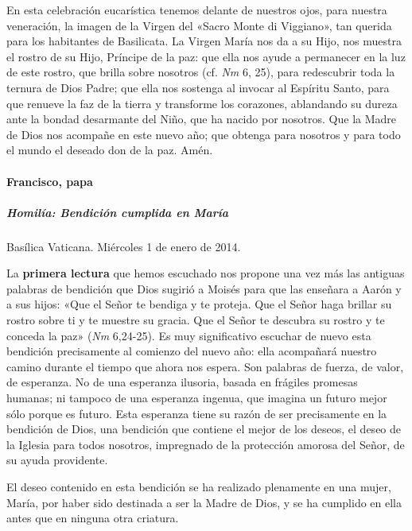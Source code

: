 \documentclass[]{article}
\let\oldparagraph\paragraph
\renewcommand{\paragraph}[1]{\oldparagraph{#1}\mbox{}}
\let\oldsubparagraph\subparagraph
\renewcommand{\subparagraph}[1]{\oldsubparagraph{#1}\mbox{}}
\begin{document}
En esta celebración eucarística tenemos delante de nuestros ojos, para
nuestra veneración, la imagen de la Virgen del «Sacro Monte di
Viggiano», tan querida para los habitantes de Basilicata. La Virgen
María nos da a su Hijo, nos muestra el rostro de su Hijo, Príncipe de la
paz: que ella nos ayude a permanecer en la luz de este rostro, que
brilla sobre nosotros (cf. \emph{Nm} 6, 25), para redescubrir toda la
ternura de Dios Padre; que ella nos sostenga al invocar al Espíritu
Santo, para que renueve la faz de la tierra y transforme los corazones,
ablandando su dureza ante la bondad desarmante del Niño, que ha nacido
por nosotros. Que la Madre de Dios nos acompañe en este nuevo año; que
obtenga para nosotros y para todo el mundo el deseado don de la paz.
Amén.

\protect\hypertarget{_Toc448662843}{}{\protect\hypertarget{_Toc448690362}{}{\protect\hypertarget{_Toc448708385}{}{\protect\hypertarget{_Toc448709471}{}{\protect\hypertarget{_Toc449554473}{}{}}}}}

\paragraph{Francisco, papa}\label{francisco-papa-6}

\subparagraph{Homilía: Bendición cumplida en
María}\label{homiluxeda-bendiciuxf3n-cumplida-en-maruxeda}

Basílica Vaticana. Miércoles 1 de enero de 2014.

La \textbf{primera lectura} que hemos escuchado nos propone una vez más
las antiguas palabras de bendición que Dios sugirió a Moisés para que
las enseñara a Aarón y a sus hijos: «Que el Señor te bendiga y te
proteja. Que el Señor haga brillar su rostro sobre ti y te muestre su
gracia. Que el Señor te descubra su rostro y te conceda la paz»
(\emph{Nm} 6,24-25). Es muy significativo escuchar de nuevo esta
bendición precisamente al comienzo del nuevo año: ella acompañará
nuestro camino durante el tiempo que ahora nos espera. Son palabras de
fuerza, de valor, de esperanza. No de una esperanza ilusoria, basada en
frágiles promesas humanas; ni tampoco de una esperanza ingenua, que
imagina un futuro mejor sólo porque es futuro. Esta esperanza tiene su
razón de ser precisamente en la bendición de Dios, una bendición que
contiene el mejor de los deseos, el deseo de la Iglesia para todos
nosotros, impregnado de la protección amorosa del Señor, de su ayuda
providente.

El deseo contenido en esta bendición se ha realizado plenamente en una
mujer, María, por haber sido destinada a ser la Madre de Dios, y se ha
cumplido en ella antes que en ninguna otra criatura.
\end{document}
